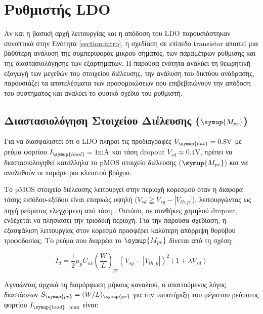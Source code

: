 \section{Ρυθμιστής LDO}\label{section:LDO}

Αν και η βασική αρχή λειτουργίας και η απόδοση του LDO παρουσιάστηκαν συνοπτικά στην Ενότητα \ref{section:intro}, η σχεδίαση σε επίπεδο transistor απαιτεί μια βαθύτερη ανάλυση της συμπεριφοράς μικρού σήματος, των παραμέτρων ρύθμισης και της διαστασιολόγησης των εξαρτημάτων. Η παρούσα ενότητα αναλύει τη θεωρητική εξαγωγή των μεγεθών του στοιχείου διέλευσης, την ανάλυση του δικτύου ανάδρασης, παρουσιάζει τα αποτελέσματα των προσομοιώσεων που επιβεβαιώνουν την απόδοση του συστήματος και αναλύει το φυσικό σχέδιο του ρυθμιστή.

\subsection{Διαστασιολόγηση Στοιχείου Διέλευσης ($\symup{M_{pe}}$)}

Για να διασφαλιστεί ότι ο LDO πληροί τις προδιαγραφές $V_{\symup{out}}=0.8\unit{\volt}$ με ρεύμα φορτίου $I_{\symup{load}}=1\unit{\milli\ampere}$ και τάση dropout $V_{sd} \approx 0.4\unit{\volt}$, πρέπει να διαστασιολογηθεί κατάλληλα το pMOS στοιχείο διέλευσης ($\symup{M_{pe}}$) και να αναλυθούν οι παράμετροι κλειστού βρόχου.\par
Το pMOS στοιχείο διέλευσης λειτουργεί στην περιοχή κορεσμού όταν η διαφορά τάσης εισόδου-εξόδου είναι επαρκώς υψηλή ($V_{sd} \gneqq V_{sg} - |V_{th,p}|$), λειτουργώντας ως πηγή ρεύματος ελεγχόμενη από τάση \cite{RazaviFundamentals}. Ωστόσο, σε συνθήκες χαμηλού dropout, ενδέχεται να πλησιάσει την τριοδική περιοχή. Για την παρούσα σχεδίαση, η εξασφάλιση λειτουργίας στον κορεσμό προσφέρει καλύτερη απόρριψη θορύβου τροφοδοσίας. Το ρεύμα που διαρρέει το $\symup{M_{pe}}$ δίνεται από τη σχέση:

\begin{equation}
    I_{d} = \frac{1}{2} \mu_p C_{ox} \left(\frac{W}{L}\right)_{pe} (V_{sg} - |V_{th,p}|)^2 (1 + \lambda V_{sd})
\end{equation}

Αγνοώντας αρχικά τη διαμόρφωση μήκους καναλιού, ο απαιτούμενος λόγος διαστάσεων $S_{\symup{pe}} = (W/L)_{\symup{pe}}$ για την υποστήριξη του μέγιστου ρεύματος φορτίου $I_{\symup{load},\ \max}$ είναι:

